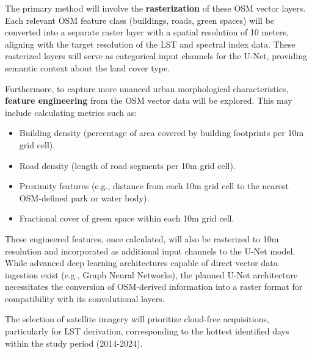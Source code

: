 \documentclass{article}
\begin{document}
The primary method will involve the \textbf{rasterization} of these OSM vector layers. Each relevant OSM feature class (buildings, roads, green spaces) will be converted into a separate raster layer with a spatial resolution of 10 meters, aligning with the target resolution of the LST and spectral index data. These rasterized layers will serve as categorical input channels for the U-Net, providing semantic context about the land cover type.

Furthermore, to capture more nuanced urban morphological characteristics, \textbf{feature engineering} from the OSM vector data will be explored. This may include calculating metrics such as:
\begin{itemize}
    \item Building density (percentage of area covered by building footprints per 10m grid cell).
    \item Road density (length of road segments per 10m grid cell).
    \item Proximity features (e.g., distance from each 10m grid cell to the nearest OSM-defined park or water body).
    \item Fractional cover of green space within each 10m grid cell.
\end{itemize}
These engineered features, once calculated, will also be rasterized to 10m resolution and incorporated as additional input channels to the U-Net model. While advanced deep learning architectures capable of direct vector data ingestion exist (e.g., Graph Neural Networks), the planned U-Net architecture necessitates the conversion of OSM-derived information into a raster format for compatibility with its convolutional layers.

The selection of satellite imagery will prioritize cloud-free acquisitions, particularly for LST derivation, corresponding to the hottest identified days within the study period (2014-2024).
\end{document}
